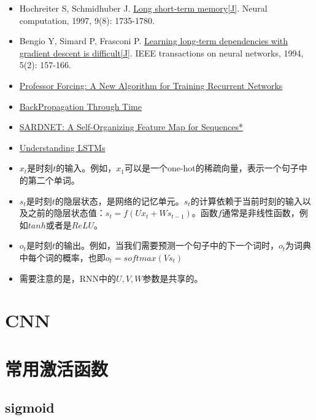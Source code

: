 \documentclass[10pt,a4paper]{ctexbook}
\begin{document}
\begin{itemize}
\item Hochreiter S, Schmidhuber J. \href{http://web.eecs.utk.edu/~itamar/courses/ECE-692/Bobby_paper1.pdf}{Long short-term memory[J]}. Neural computation, 1997, 9(8): 1735-1780.
\item Bengio Y, Simard P, Frasconi P. \href{http://www-dsi.ing.unifi.it/~paolo/ps/tnn-94-gradient.pdf}{Learning long-term dependencies with gradient descent is difficult[J]}. IEEE transactions on neural networks, 1994, 5(2): 157-166.
\item \href{https://arxiv.org/pdf/1610.09038.pdf}{Professor Forcing: A New Algorithm for Training Recurrent Networks}
\item \href{http://ir.hit.edu.cn/~jguo/docs/notes/bptt.pdf}{BackPropagation Through Time}
\item \href{http://nn.cs.utexas.edu/downloads/papers/james.sardnet.pdf}{SARDNET: A Self-Organizing Feature Map for Sequences*}
\item \href{http://colah.github.io/posts/2015-08-Understanding-LSTMs/}{Understanding LSTMs}
\end{itemize}

\begin{itemize}
\item $x_t$是时刻$t$的输入。例如，$x_1$可以是一个one-hot的稀疏向量，表示一个句子中的第二个单词。
\item $s_t$是时刻$t$的隐层状态，是网络的记忆单元。$s_t$的计算依赖于当前时刻的输入以及之前的隐层状态值：$s_t=f(Ux_t+Ws_{t-1})$。函数$f$通常是非线性函数，例如$tanh$或者是$ReLU$。
\item $o_t$是时刻$t$的输出。例如，当我们需要预测一个句子中的下一个词时，$o_t$为词典中每个词的概率，也即$o_t=softmax(Vs_t)$
\item 需要注意的是，RNN中的$U,V,W$参数是共享的。
\end{itemize}



\section{CNN}

\section{常用激活函数}

\subsection{sigmoid}
\end{document}
